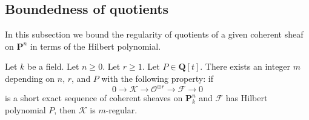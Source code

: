 \subsection{Boundedness of quotients}
\label{subsection-boundedness}

\noindent
In this subsection we bound the regularity of quotients of
a given coherent sheaf on $\mathbf{P}^n$ in terms of the
Hilbert polynomial.

\begin{lemma}
\label{lemma-bound-quotients-free}
Let $k$ be a field. Let $n \geq 0$. Let $r \geq 1$. Let $P \in \mathbf{Q}[t]$.
There exists an integer $m$ depending on $n$, $r$, and $P$
with the following property: if
$$
0 \to \mathcal{K} \to \mathcal{O}^{\oplus r} \to \mathcal{F} \to 0
$$
is a short exact sequence of coherent sheaves on $\mathbf{P}^n_k$
and $\mathcal{F}$ has Hilbert polynomial $P$, then
$\mathcal{K}$ is $m$-regular.
\end{lemma}

